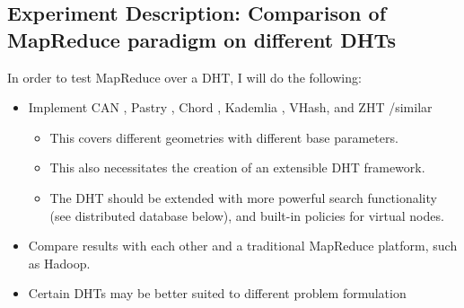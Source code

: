 \documentclass[10pt,letterpaper,twoside]{report}
\begin{document}
\subsection{Experiment Description: Comparison of MapReduce paradigm on different DHTs}
In order to test MapReduce over a DHT, I will do the following:
\begin{itemize}
	\item Implement CAN \cite{can}, Pastry \cite{pastry}, Chord \cite{chord}, Kademlia \cite{kademlia}, VHash, and ZHT \cite{li2013zht} /similar
	\begin{itemize}	
		\item This covers different geometries with different base parameters.
		\item This also necessitates the creation of an extensible DHT framework.
		\item  The DHT should be extended with more powerful search functionality (see distributed database below), and built-in policies for virtual nodes.
		
	\end{itemize}
	\item Compare results with each other and a traditional MapReduce platform, such as Hadoop.
	\item Certain DHTs may be better suited to different problem formulation
	
\end{itemize}





\end{document}
